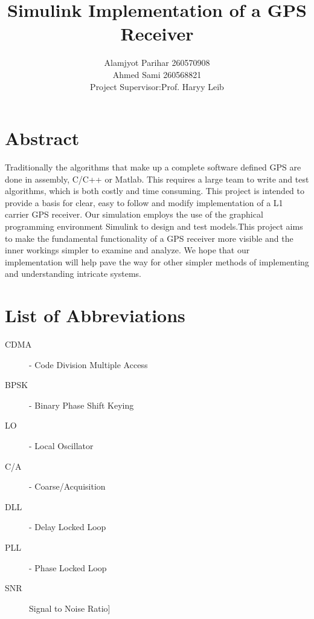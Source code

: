 \documentclass[11pt]{article}
\numberwithin{equation}{subsection}
\begin{document}
	
	
	\title{Simulink Implementation of a GPS Receiver}
	\author{Alamjyot Parihar 260570908 \\ Ahmed Sami 260568821\\
		Project Supervisor:Prof. Haryy Leib}
	
	\maketitle
	\newpage
	\tableofcontents
	\newpage
	\listoffigures
	\listoftables
	\newpage
	
	\section{Abstract}
	
	Traditionally the algorithms that make up a complete software defined GPS are done in assembly, C/C++ or Matlab. This requires a large team to write and test algorithms, which is both costly and time consuming. This project is intended to provide a basis for clear, easy to follow and modify implementation of a L1 carrier GPS receiver. Our simulation employs the use of the graphical programming environment Simulink to design and test models.This project aims to make the fundamental functionality of a GPS receiver more visible and the inner workings simpler to examine and analyze. We hope that our implementation will help pave the way for other simpler methods of implementing and understanding intricate systems.
	
	\section{List of Abbreviations}
	
	\begin{description}
		\item[CDMA] - Code Division Multiple Access
		\item[BPSK] - Binary Phase Shift Keying
		\item[LO] - Local Oscillator
		\item[C/A] - Coarse/Acquisition
		\item[DLL] - Delay Locked Loop
		\item[PLL] - Phase Locked Loop
		\item [SNR]{Signal to Noise Ratio}]
	\end{description}
\end{document}
